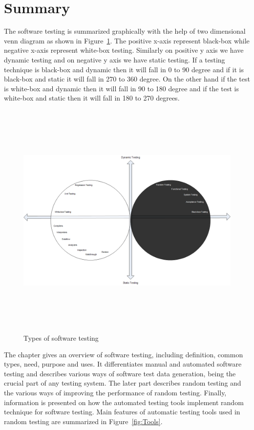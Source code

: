 \section{Summary}
The software testing is summarized graphically with the help of two dimensional venn diagram as shown in Figure~\ref{fig:testDataGenerators_2}. The positive x-axis represent black-box while negative x-axis represent white-box testing. Similarly on positive y axis we have dynamic testing and on negative y axis we have static testing. If a testing technique is black-box and dynamic then it will fall in 0 to 90 degree and if it is black-box and static it will fall in 270 to 360 degree. On the other hand if the test is white-box and dynamic then it will fall in 90 to 180 degree and if the test is white-box and static then it will fall in 180 to 270 degrees.
\bigskip
\begin{figure}[h]
	\centering
	\centerline{\includegraphics[width=16cm, height=12cm ]{chapter2/DrawingTesting.png}}
	\bigskip
	\caption{Types of software testing}
	\label{fig:testDataGenerators_2}
\end{figure}
\bigskip

The chapter gives an overview of software testing, including definition, common types, need, purpose and uses. It differentiates manual and automated software testing and describes various ways of software test data generation, being the crucial part of any testing system. The later part describes random testing and the various ways of improving the performance of random testing. Finally, information is presented on how the automated testing tools implement random technique for software testing. Main features of automatic testing tools used in random testing are summarized in Figure~\ref{fig:Tools}.

